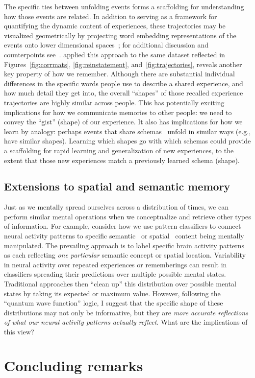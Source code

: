 \documentclass{article}
\begin{document}
The specific ties between unfolding events forms a scaffolding for understanding how those events are related.  In addition to serving as a framework for quantifying the dynamic content of experiences, these trajectories may be visualized geometrically by projecting word embedding representations of the events onto lower dimensional spaces~\citep[e.g., ][]{HeusEtal18a}; for additional discussion and counterpoints see~\citep{JollChan18}.  \cite{HeusEtal18c} applied this approach to the same dataset reflected in Figures~\ref{fig:corrmats}, \ref{fig:reinstatement}, and~\ref{fig:trajectories}, reveals another key property of how we remember.  Although there are substantial individual differences in the specific words people use to describe a shared experience, and how much detail they get into, the overall ``shapes'' of those recalled experience trajectories are highly similar across people.  This has potentially exciting implications for how we communicate memories to other people: we need to convey the ``gist'' (shape) of our experience.  It also has implications for how we learn by analogy: perhaps events that share schemas~\citep[e.g., ][]{BaldEtal18}  unfold in similar ways (e.g., have similar shapes).  Learning which shapes go with which schemas could provide a scaffolding for rapid learning and generalization of new experiences, to the extent that those new experiences match a previously learned schema (shape).




\subsection*{Extensions to spatial and semantic memory}
Just as we mentally spread ourselves across a distribution of times, we can perform similar mental operations when we conceptualize and retrieve other types of information.  For example, consider how we use pattern classifiers to connect neural activity patterns to specific semantic~\citep{PolyEtal05, MitcEtal08, MannEtal12} or spatial~\citep{MillEtal13} content being mentally manipulated.  The prevailing approach is to label specific brain activity patterns as each reflecting \textit{one particular} semantic concept or spatial location.  Variability in neural activity over repeated experiences or rememberings can result in classifiers spreading their predictions over multiple possible mental states.  Traditional approaches then ``clean up'' this distribution over possible mental states by taking its expected or maximum value.  However, following the ``quantum wave function'' logic, I suggest that the specific shape of these distributions may not only be informative, but they are \textit{more accurate reflections of what our neural activity patterns actually reflect}.  What are the implications of this view?



\section*{Concluding remarks}




\end{document}
